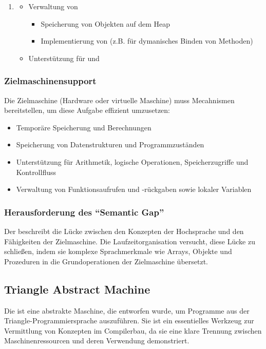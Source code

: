 \begin{enumerate}
\begin{itemize}
        \item Unterstützung für Rekursion
    \end{itemize}
    \item {}
    \begin{itemize}
        \item Verwaltung von 
        \begin{itemize}
            \item Speicherung von Objekten auf dem Heap
            \item Implementierung von  (z.B. für dymanisches Binden von Methoden)
        \end{itemize}
        \item Unterstützung für  und 
    \end{itemize}
\end{enumerate}
\subsubsection{Zielmaschinensupport}
Die Zielmaschine (Hardware oder virtuelle Maschine) muss Mecahnismen bereitstellen, um diese Aufgabe effizient umzusetzen:
\begin{itemize}
    \item {} Temporäre Speicherung und Berechnungen
    \item {} Speicherung von Datenstrukturen und Programmzuständen
    \item {} Unterstützung für Arithmetik, logische Operationen, Speicherzugriffe und Kontrollfluss
    \item {} Verwaltung von Funktionsaufrufen und -rückgaben sowie lokaler Variablen
\end{itemize}
\subsubsection{Herausforderung des \enquote{Semantic Gap}}
Der  beschreibt die Lücke zwischen den Konzepten der Hochsprache und den Fähigkeiten der Zielmaschine. Die Laufzeitorganisation versucht, diese Lücke zu schließen, indem sie komplexe Sprachmerkmale wie Arrays, Objekte und Prozeduren in die Grundoperationen der Zielmaschine übersetzt.
\subsection{Triangle Abstract Machine}
Die  ist eine abstrakte Maschine, die entworfen wurde, um Programme aus der Triangle-Programmiersprache auszuführen. Sie ist ein essentielles Werkzeug zur Vermittlung von Konzepten im Compilerbau, da sie eine klare Trennung zwischen Maschinenressourcen und deren Verwendung demonstriert.
